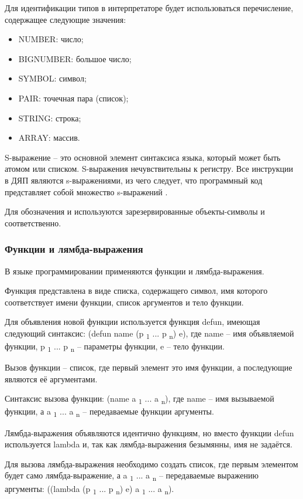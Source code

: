 Для идентификации типов в интерпретаторе будет использоваться перечисление, содержащее следующие значения:
\begin{itemize}
	\item NUMBER: число;
	\item BIGNUMBER: большое число;
	\item SYMBOL: символ;
	\item PAIR: точечная пара (список);
	\item STRING: строка;
	\item ARRAY: массив.
\end{itemize}

S-выражение -- это основной элемент синтаксиса языка, который может быть атомом или списком. S-выражения нечувствительны к регистру. Все инструкции в ДЯП являются s-выражениями, из чего следует, что программный код представляет собой множество s-выражений \cite{e10}.

Для обозначения  и  используются зарезервированные объекты-символы  и  соответственно.

\subsubsection{Функции и лямбда-выражения}

В языке программировании применяются функции и лямбда-выражения.

Функция представлена в виде списка, содержащего символ, имя которого соответствует имени функции, список аргументов и тело функции.

Для объявления новой функции используется функция defun, имеющая следующий синтаксис:
(defun name (p \textsubscript 1 ... p \textsubscript n) e), где name -- имя объявляемой функции, p \textsubscript 1 ... p \textsubscript n -- параметры функции, e -- тело функции.

Вызов функции -- список, где первый элемент это имя функции, а последующие являются её аргументами.

Синтаксис вызова функции:
(name a \textsubscript 1 ... a \textsubscript n), где name -- имя вызываемой функции, а a \textsubscript 1 ... a \textsubscript n -- передаваемые функции аргументы.

Лямбда-выражения объявляются идентично функциям, но вместо функции defun используется lambda и, так как лямбда-выражения безымянны, имя не задаётся.

Для вызова лямбда-выражения необходимо создать список, где первым элементом будет само лямбда-выражение, а a \textsubscript 1 ... a \textsubscript n -- передаваемые выражению аргументы: 
((lambda (p \textsubscript 1 ... p \textsubscript n) e) a \textsubscript 1 ... a \textsubscript n).

